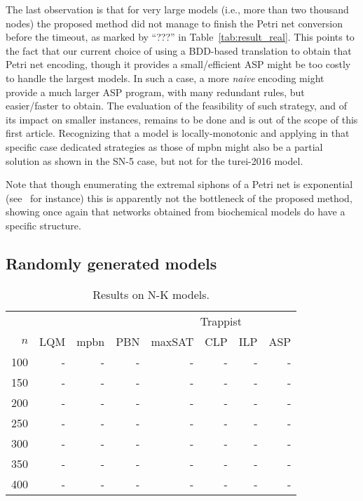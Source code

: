 \documentclass[preprint,12pt]{elsarticle}
\begin{document}
The last observation is that for very large models (i.e., more than two thousand nodes) the proposed method did not manage to finish the Petri net conversion before the timeout, as marked by ``???'' in Table~\ref{tab:result_real}.
This points to the fact that our current choice of using a BDD-based translation to obtain that Petri net encoding, though it provides a small/efficient ASP might be too costly to handle the largest models.
In such a case, a more \emph{naive} encoding might provide a much larger ASP program, with many redundant rules, but easier/faster to obtain.
The evaluation of the feasibility of such strategy, and of its impact on smaller instances, remains to be done and is out of the scope of this first article.
Recognizing that a model is locally-monotonic and applying in that specific case dedicated strategies as those of mpbn might also be a partial solution as shown in the SN-5 case, but not for the turei-2016 model.

Note that though enumerating the extremal siphons of a Petri net is exponential (see~\cite{nabli2016enumerating} for instance) this is apparently not the bottleneck of the proposed method, showing once again that networks obtained from biochemical models do have a specific structure.

\subsection{Randomly generated models}

\begin{table}[!htb]
  \caption{Results on N-K models.}
  \centering%
  \label{tab:result_N_K}
  \begin{tabular}{rrrrrrrr}
    \toprule
    & & & & \multicolumn{4}{c}{Trappist}\\
    \cmidrule(rr){5-8}
    \(n\) & LQM & mpbn & PBN & maxSAT & CLP & ILP & ASP \\
    \midrule
    100 & - & - & - & - & - & - & - \\
    150 & - & - & - & - & - & - & - \\
    200 & - & - & - & - & - & - & - \\
    250 & - & - & - & - & - & - & - \\
    300 & - & - & - & - & - & - & - \\
    350 & - & - & - & - & - & - & - \\
    400 & - & - & - & - & - & - & - \\
    \bottomrule
  \end{tabular}
\end{table}
\end{document}
